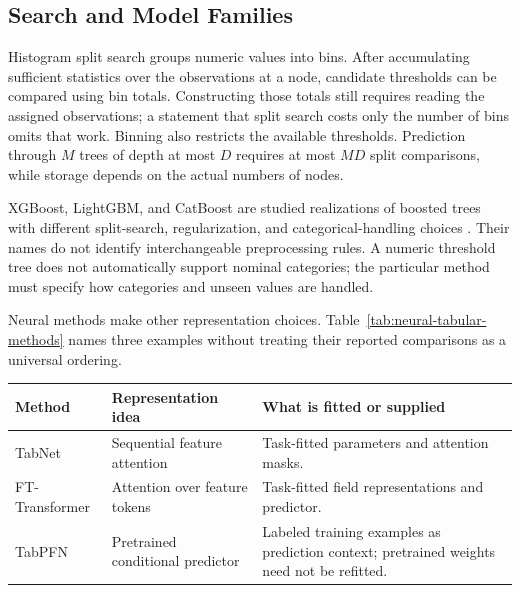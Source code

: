 \subsection{Search and Model Families}

Histogram split search groups numeric values into bins. After accumulating sufficient statistics over the observations at a node, candidate thresholds can be compared using bin totals. Constructing those totals still requires reading the assigned observations; a statement that split search costs only the number of bins omits that work. Binning also restricts the available thresholds. Prediction through $M$ trees of depth at most $D$ requires at most $MD$ split comparisons, while storage depends on the actual numbers of nodes.

XGBoost, LightGBM, and CatBoost are studied realizations of boosted trees with different split-search, regularization, and categorical-handling choices \citep{chen2016xgboost,ke2017lightgbm,prokhorenkova2018catboost}. Their names do not identify interchangeable preprocessing rules. A numeric threshold tree does not automatically support nominal categories; the particular method must specify how categories and unseen values are handled.

Neural methods make other representation choices. Table~\ref{tab:neural-tabular-methods} names three examples without treating their reported comparisons as a universal ordering.

\begin{center}
\begin{minipage}{\linewidth}
\centering
\small
\begin{tabular}{L{1.85cm}L{3.25cm}L{4.25cm}}
\toprule
Method & Representation idea & What is fitted or supplied \\
\midrule
TabNet & Sequential feature attention & Task-fitted parameters and attention masks. \\
FT-\allowbreak Transformer & Attention over feature tokens & Task-fitted field representations and predictor. \\
TabPFN & Pretrained conditional predictor & Labeled training examples as prediction context; pretrained weights need not be refitted. \\
\bottomrule
\end{tabular}
\label{tab:neural-tabular-methods}
\end{minipage}
\end{center}

